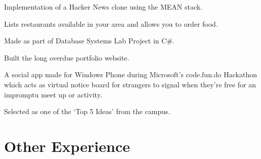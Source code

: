 \documentclass[a4paper]{resume}
\begin{document}
\begin{minipage}[t]{0.66\textwidth}

\begin{tightitemize}
\item Implementation of a Hacker News clone using the MEAN stack.
\end{tightitemize}

\sectionspace %




\begin{tightitemize}
\item Lists restaurants available in your area and allows you to order food.
\item Made as part of Database Systems Lab Project in C\#.
\end{tightitemize}

\sectionspace %




\begin{tightitemize}
\item Built the long overdue portfolio website.
\end{tightitemize}

\sectionspace %




\begin{tightitemize}
\item A social app made for Windows Phone during Microsoft’s code.fun.do Hackathon which acts as virtual notice board for strangers to signal when they’re free for an impromptu meet up or activity.
\item Selected as one of the ‘Top 5 Ideas’ from the campus.
\end{tightitemize}

\sectionspace %


\section{Other Experience}


\end{minipage}
\end{document}

